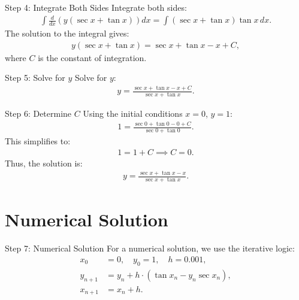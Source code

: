 \documentclass{beamer}
\begin{document}
\begin{frame}{Step 4: Integrate Both Sides}
Integrate both sides:
\begin{align}
    \int \frac{d}{dx} \left( y (\sec x + \tan x) \right) dx = \int (\sec x + \tan x) \tan x \, dx.
\end{align}
The solution to the integral gives:
\begin{align}
    y (\sec x + \tan x) = \sec x + \tan x - x + C,
\end{align}
where $C$ is the constant of integration.
\end{frame}

\begin{frame}{Step 5: Solve for $y$}
Solve for $y$:
\begin{align}
    y = \frac{\sec x + \tan x - x + C}{\sec x + \tan x}.
\end{align}
\end{frame}

\begin{frame}{Step 6: Determine $C$}
Using the initial conditions $x = 0$, $y = 1$:
\begin{align}
    1 = \frac{\sec 0 + \tan 0 - 0 + C}{\sec 0 + \tan 0}.
\end{align}
This simplifies to:
\begin{align}
    1 = 1 + C \implies C = 0.
\end{align}
Thus, the solution is:
\begin{align}
    y = \frac{\sec x + \tan x - x}{\sec x + \tan x}.
\end{align}
\end{frame}

\section{Numerical Solution}
\begin{frame}{Step 7: Numerical Solution}
For a numerical solution, we use the iterative logic:
\begin{align}
    x_0 &= 0, \quad y_0 = 1, \quad h = 0.001, \\
    y_{n+1} &= y_n + h \cdot (\tan x_n - y_n \sec x_n), \\
    x_{n+1} &= x_n + h.
\end{align}
\end{frame}
\end{document}
